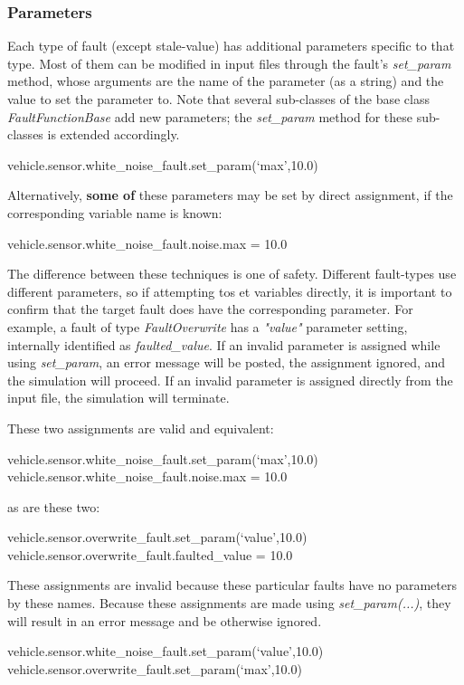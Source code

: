 \documentclass[11pt,fleqn]{report}
\begin{document}
\subsubsection{Parameters}
\label{sec:UG:DI:config_fault:param}
Each type of fault (except stale-value) has additional parameters specific to
that type.
Most of them can be modified in input files through the fault's
\textit{set\_param} method, whose arguments are the name of the parameter (as a
string) and the value to set the parameter to. Note that several sub-classes of
the base class \textit{FaultFunctionBase} add new parameters; the
\textit{set\_param} method for these sub-classes is extended accordingly.
\begin{codePython}
 vehicle.sensor.white_noise_fault.set_param(`max',10.0)
\end{codePython}
Alternatively, \textbf{some of} these parameters may be set by direct
assignment, if the corresponding variable name is known:
\begin{codePython}
 vehicle.sensor.white_noise_fault.noise.max = 10.0
\end{codePython}
The difference between these techniques is one of safety. Different
fault-types use different parameters, so if attempting tos et variables
directly, it is important to confirm that the target fault does have the
corresponding parameter. For example, a fault of type \textit{FaultOverwrite}
has a \textit{"value"} parameter setting, internally identified as
\textit{faulted\_value}. If an invalid
parameter is assigned while using \textit{set\_param}, an error message will be
posted, the assignment ignored, and the simulation will proceed.
If an invalid parameter is assigned
directly from the input file, the simulation will terminate.

These two assignments are valid and equivalent:
\begin{codePython}
 vehicle.sensor.white_noise_fault.set_param(`max',10.0)
 vehicle.sensor.white_noise_fault.noise.max = 10.0
\end{codePython}
as are these two:
\begin{codePython}
 vehicle.sensor.overwrite_fault.set_param(`value',10.0)
 vehicle.sensor.overwrite_fault.faulted_value = 10.0
\end{codePython}

These assignments are invalid because these particular faults have no
parameters by these names. Because these assignments are made using
\textit{set\_param(...)}, they will result in an error message and be
otherwise ignored.
\begin{codePython}
 vehicle.sensor.white_noise_fault.set_param(`value',10.0)
 vehicle.sensor.overwrite_fault.set_param(`max',10.0)
\end{codePython}
\end{document}
